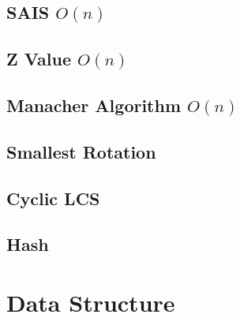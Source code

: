 \documentclass[a4paper,10pt,twocolumn,oneside]{article}
\begin{document}
\subsection{SAIS $O(n)$}


%

\subsection{Z Value $O(n)$}


%

\subsection{Manacher Algorithm $O(n)$}


\subsection{Smallest Rotation}


%

\subsection{Cyclic LCS}


\subsection{Hash}
 


\section{Data Structure}
\end{document}
